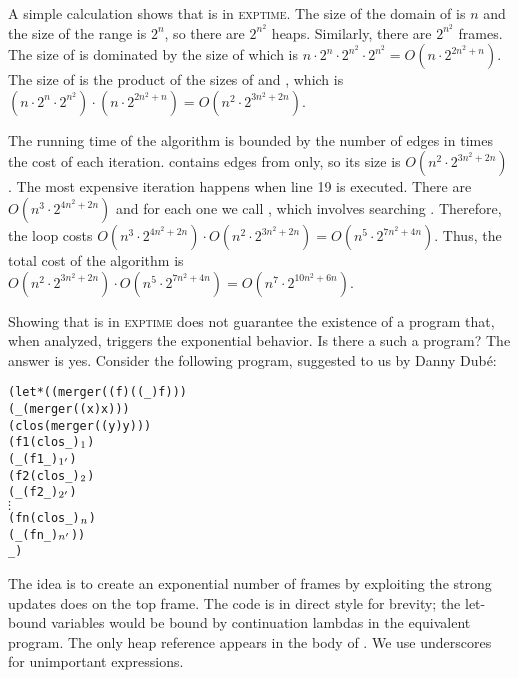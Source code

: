 \documentclass{LMCS}
\theoremstyle{definition} \newtheorem{property}[thm]{Property}
\begin{document}
A simple calculation shows that \cfat{} is in \textsc{exptime}.
The size of the domain of \dheap{} is $n$ and the size of the range is $2^n$,
so there are $2^{n^2}$ heaps.
Similarly, there are $2^{n^2}$ frames.
The size of \dlstate{} is dominated by the size of \dlcapply{} which is
$n \cdot 2^n \cdot 2^{n^2} \cdot 2^{n^2} = O(n \cdot 2^{2n^2 + n})$.
The size of \seen{} is the product of the sizes of \dluapply{} and \dlstate{},
which is $(n \cdot 2^n \cdot 2^{n^2}) \cdot (n \cdot 2^{2n^2 + n}) = 
O(n^2 \cdot 2^{3n^2 + 2n})$.

The running time of the algorithm is bounded by the number of edges in \work{} 
times the cost of each iteration.
\work{} contains edges from \seen{} only, so its size is 
$O(n^2 \cdot 2^{3n^2 + 2n})$.
The most expensive iteration happens when line 19 is executed.
There are $O(n^3 \cdot 2^{4n^2 + 2n})$ \tcallers{} and for each one we call 
, which involves searching \seen.
Therefore, the loop costs 
$O(n^3 \cdot 2^{4n^2 + 2n}) \cdot O(n^2 \cdot 2^{3n^2 + 2n}) = 
O(n^5 \cdot 2^{7n^2 + 4n})$.
Thus, the total cost of the algorithm is 
$O(n^2 \cdot 2^{3n^2 + 2n}) \cdot O(n^5 \cdot 2^{7n^2 + 4n}) = 
 O(n^7 \cdot 2^{10n^2 + 6n})$.

Showing that \cfat{} is in \textsc{exptime} does not guarantee the existence of
a program that, when analyzed, triggers the exponential behavior. 
Is there a such a program? The answer is yes.
Consider the following program, suggested to us by Danny Dub\'e:
{\footnotesize
\begin{alltt}
                        (let* ((merger   ((f) ((_) f)))
                               (_        (merger ((x) x)))
                               (clos     (merger ((y) y)))
                               (f1       (clos _)\(\sb{1}\))
                               (_        (f1 _)\(\sb{1'}\))
                               (f2       (clos _)\(\sb{2}\))
                               (_        (f2 _)\(\sb{2'}\))
                                       \(\vdots\)
                               (fn       (clos _)\(\sb{n}\))
                               (_        (fn _)\(\sb{n'}\)))
                          _ ) \end{alltt}}
The idea is to create an exponential number of frames by exploiting the strong
updates \cfat{} does on the top frame.
The code is in direct style for brevity;
the let-bound variables would be bound by continuation lambdas in the equivalent
\cps{} program. 
The only heap reference appears in the body of .
We use underscores for unimportant expressions.
\end{document}
